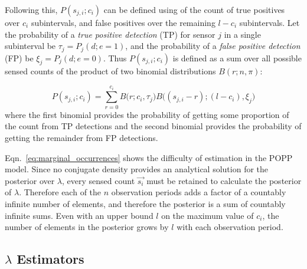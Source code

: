 Following this, $P(s_{j,i} ; c_i)$ can be defined using of the count of true  positives over $c_i$ subintervals, and false positives over the remaining $l-c_i$ subintervals. 
% 
Let the probability of a \textit{true positive detection} (TP) for sensor $j$ in a single subinterval be $\tau_j = P_j(d;e=1)$, and the probability of a \textit{false positive detection} (FP) be $\xi_j = P_j(d;e=0)$. Thus $P(s_{j,i} ; c_i)$ is defined as a sum over all possible sensed counts of the product of two binomial distributions $B(r ; n,\pi)$: 

\begin{equation}
	\label{eq:joint_binomial_distribution}
    P(s_{j,i} ; c_i) \! = \! \! \! \displaystyle\sum_{r = 0}^{c_{i}} \! \! B\Big(r ; c_i, \tau_j\Big) B\Big((s_{j,i} - r) ; (l - c_{i}), \xi_j \Big)
\end{equation}
\noindent where the first binomial provides the probability of getting some proportion of the count from  TP detections and the second binomial provides the probability of getting the remainder from FP detections. 


Eqn.~\ref{eq:marginal_occurrences} shows the difficulty of estimation in the POPP model. Since no conjugate density provides an analytical solution for the posterior over $\lambda$, every sensed count $\vec{s_i}$ must be retained to calculate the posterior of $\lambda$. Therefore each of the $n$ observation periods adds a factor of a countably infinite number of elements, and therefore the posterior is a sum of countably infinite sums. Even with an upper bound $l$ on the maximum value of $c_i$, the number of elements in the posterior grows by $l$ with each observation period.
% 
\subsection*{$\lambda$ Estimators}

